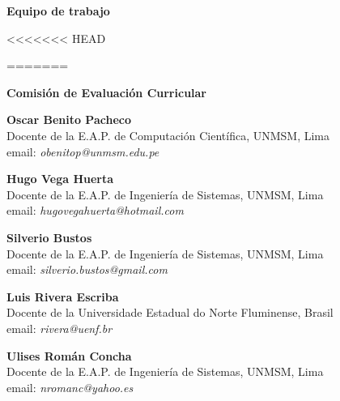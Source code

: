 \begin{center}
{\bf \Huge Equipo de trabajo}
\end{center}
\vspace{1cm}

<<<<<<< HEAD

=======
\begin{center}
\textbf{Comisión de Evaluación Curricular}\\
\end{center}

\begin{center}
\textbf{Oscar Benito Pacheco}\\
Docente de la E.A.P. de Computación Cientí­fica, UNMSM, Lima\\ 
email: \textit{obenitop@unmsm.edu.pe}\\
\end{center}

\begin{center}
\textbf{Hugo Vega Huerta}\\
Docente de la E.A.P. de Ingenierí­a de Sistemas, UNMSM, Lima\\ 
email: \textit{hugovegahuerta@hotmail.com}\\
\end{center}

\begin{center}
\textbf{Silverio Bustos}\\
Docente de la E.A.P. de Ingenierí­a de Sistemas, UNMSM, Lima\\ 
email: \textit{silverio.bustos@gmail.com}\\
\end{center}

\begin{center}
\textbf{Luis Rivera Escriba}\\
Docente de la Universidade Estadual do Norte Fluminense, Brasil\\ 
email: \textit{rivera@uenf.br}\\
\end{center}

\begin{center}
\textbf{Ulises Román Concha}\\
Docente de la E.A.P. de Ingenierí­a de Sistemas, UNMSM, Lima\\ 
email: \textit{nromanc@yahoo.es}\\
\end{center}

